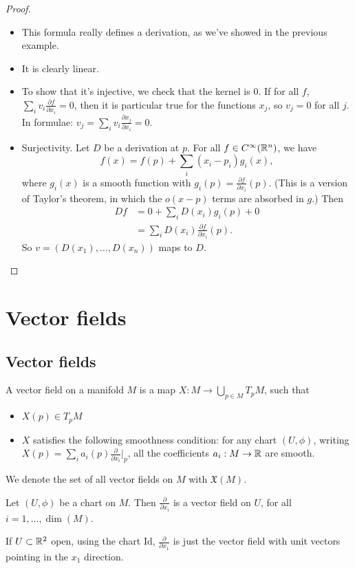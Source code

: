 \begin{proof}\leavevmode
    \begin{itemize}
        \item This formula really defines a derivation, as we've showed in the previous example.

        \item It is clearly linear.
        \item To show that it's injective, we check that the kernel is $0$.
            If for all $f$, $\sum_i v_{i} \frac{\partial f}{\partial x_i} = 0$, then it is particular true for the functions $x_{j}$, so $v_{j} = 0$ for all $j$. In formulae: $v_{j} =\sum_i v_{i} \frac{\partial x_{j}}{\partial x_i}= 0$.
        \item Surjectivity. Let $D$ be a derivation at $p$.
            For all $f \in C^{\infty}(\mathbb{R}^n)$, we have $$f(x) = f(p) + \sum_i (x_{i} - p_{i}) g_i(x),$$ where $g_i(x)$ is a smooth function with $g_i(p) = \frac{\partial f}{\partial x_i}(p)$. (This is a version of Taylor's theorem, in which the $o(x-p)$ terms are absorbed in $g$.)
            Then 
\begin{align*}
  D f &= 0 +  \sum_i D(x_{i}) g_i(p) + 0\\
&=\sum_i D(x_{i}) \frac{\partial f}{\partial x_i}(p).
\end{align*}
 So $v = (D(x_{1}),\dots, D(x_{n}))$ maps to $D$.
    \end{itemize}
\end{proof}

\setcounter{chapter}{2}
\chapter{Vector fields}
\section{Vector fields}
\begin{definition}
    A vector field on a manifold $M$ is a map $X: M \to  \bigcup_{p \in M} T_p M$, such that
    \begin{itemize}
        \item $X(p) \in T_pM$
        \item $X$  satisfies the following smoothness condition:  for any chart $(U, \phi)$, writing $X(p) = \sum_i a_{i}(p) \frac{\partial}{\partial x_i} \Big|_p$, all the coefficients $a_{i}: M \to \mathbb{R}$ are smooth.
    \end{itemize}
\end{definition}
\begin{notation}
    We denote the set of all vector fields on $M$ with $\mathfrak X(M)$.
\end{notation}
\begin{eg}
    Let $(U, \phi)$ be a chart on $M$.  
Then    $\frac{\partial }{\partial x_i}$ is a vector field on $U$, for all $i = 1, \ldots, \dim(M)$.
\end{eg}
\begin{eg}
    If $U \subset \mathbb{R}^2$ open, using the chart $\text{Id}$, $\frac{\partial }{\partial x_1}$ is just the vector field with unit vectors pointing in the $x_1$ direction.
\end{eg}

